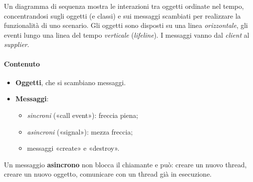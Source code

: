\documentclass[a4paper,12pt]{article}
\begin{document}
Un diagramma di sequenza mostra le interazioni tra oggetti ordinate nel tempo,
concentrandosi sugli oggetti (e classi) e sui messaggi scambiati per realizzare la
funzionalità di uno scenario. Gli oggetti sono disposti su una linea
\emph{orizzontale}, gli eventi lungo una linea del tempo \emph{verticale}
(\emph{lifeline}). I messaggi vanno dal \emph{client} al \emph{supplier}.

\paragraph{Contenuto}
\begin{itemize}
  \item \textbf{Oggetti}, che si scambiano messaggi.
  \item \textbf{Messaggi}:
  \begin{itemize}
    \item \emph{sincroni} («call event»): freccia piena;
    \item \emph{asincroni} («signal»): mezza freccia;
    \item messaggi «create» e
          «destroy».
  \end{itemize}
\end{itemize}
Un messaggio \textbf{asincrono} non blocca il chiamante e può: creare un nuovo thread,
creare un nuovo oggetto, comunicare con un thread già in esecuzione.
\end{document}
